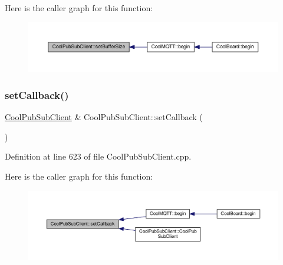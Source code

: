 Here is the caller graph for this function\+:\nopagebreak
\begin{figure}[H]
\begin{center}
\leavevmode
\includegraphics[width=350pt]{class_cool_pub_sub_client_a4f83e54f1ba96e32f725d93cdec283b7_icgraph}
\end{center}
\end{figure}
\mbox{\label{class_cool_pub_sub_client_ac5cab7658f1bdded32131241e468e661}} 
\subsubsection{\texorpdfstring{set\+Callback()}{setCallback()}}
{\footnotesize\ttfamily \hyperlink{class_cool_pub_sub_client}{Cool\+Pub\+Sub\+Client} \& Cool\+Pub\+Sub\+Client\+::set\+Callback (\begin{DoxyParamCaption}\item[{\hyperlink{class_cool_pub_sub_client_a021ec75e9fbaf658370b8005ccfddc14}{M\+Q\+T\+T\+\_\+\+C\+A\+L\+L\+B\+A\+C\+K\+\_\+\+S\+I\+G\+N\+A\+T\+U\+RE}}]{ }\end{DoxyParamCaption})}



Definition at line 623 of file Cool\+Pub\+Sub\+Client.\+cpp.

Here is the caller graph for this function\+:\nopagebreak
\begin{figure}[H]
\begin{center}
\leavevmode
\includegraphics[width=350pt]{class_cool_pub_sub_client_ac5cab7658f1bdded32131241e468e661_icgraph}
\end{center}
\end{figure}
\mbox{\label{class_cool_pub_sub_client_a7ee119b786010561ab6a9afa0798e91d}} 
